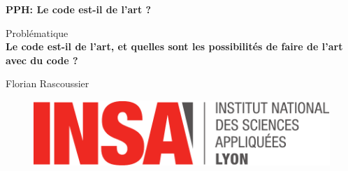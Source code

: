 \begin{titlepage}
    \begin{center}
        \vspace{2cm}

        \Large
        \textbf{PPH: Le code est-il de l'art ?}

        \vspace{2cm}
        \Large
        Problématique\\
        \textbf{Le code est-il de l'art, et quelles sont les possibilités de faire de l'art avec du code ?}
            
        \vspace{2cm}
        \normalsize
        Florian Rascoussier

        \vfill

        \begin{figure}[h]
            \centering
            \includegraphics[scale=0.7]{img/insa.pdf}
        \end{figure}
        
    \end{center}
\end{titlepage}